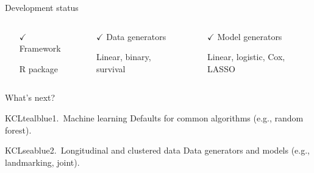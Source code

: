 \documentclass[11pt]{beamer}
\newcommand*{\tc}[2]{%
	\textcolor{#1}{#2}
}
\newcommand{\sgap}{\vspace{0.5em}}
\begin{document}
\begin{frame}[c]{Development status}


	\begin{columns}
		\begin{column}[T]{0.24\textwidth}
			\begin{itemize}
				\item[$\checkmark$]  Framework
				\item[] {\scriptsize R package}
			\end{itemize}
		\end{column}
		\begin{column}[T]{0.32\textwidth}
			\begin{itemize}
				\item[$\checkmark$]  Data generators
				\item[] {\scriptsize Linear, binary, survival}
			\end{itemize}
		\end{column}
		\begin{column}[T]{0.39\textwidth}
			\begin{itemize}
				\item[$\checkmark$] Model generators
				\item[] {\scriptsize Linear, logistic, Cox, LASSO}
			\end{itemize}
		\end{column}
	\end{columns}

	\vspace{2em}
	{\large \tc{KCLseablue}{What's next?}}
	\sgap

	\begin{cbox}{KCLtealblue}{1.\ Machine learning}
		Defaults for common algorithms (e.g., random forest).

	\end{cbox}

	\begin{cbox}{KCLseablue}{2.\ Longitudinal and clustered data}
		Data generators and models (e.g., landmarking, joint).
	\end{cbox}

\end{frame}
\end{document}
